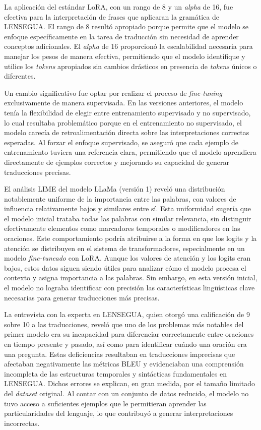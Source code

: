 La aplicación del estándar LoRA, con un rango de 8 y un \textit{alpha} de 16, fue efectiva para la interpretación de frases que aplicaran la gramática de LENSEGUA. El rango de 8 resultó apropiado porque permite que el modelo se enfoque específicamente en la tarea de traducción sin necesidad de aprender conceptos adicionales. El \textit{alpha} de 16 proporcionó la escalabilidad necesaria para manejar los pesos de manera efectiva, permitiendo que el modelo identifique y utilice los \textit{tokens} apropiados sin cambios drásticos en presencia de \textit{tokens} únicos o diferentes.

Un cambio significativo fue optar por realizar el proceso de \textit{fine-tuning} exclusivamente de manera supervisada. En las versiones anteriores, el modelo tenía la flexibilidad de elegir entre entrenamiento supervisado y no supervisado, lo cual resultaba problemático porque en el entrenamiento no supervisado, el modelo carecía de retroalimentación directa sobre las interpretaciones correctas esperadas. Al forzar el enfoque supervisado, se aseguró que cada ejemplo de entrenamiento tuviera una referencia clara, permitiendo que el modelo aprendiera directamente de ejemplos correctos y mejorando su capacidad de generar traducciones precisas.

El análisis LIME del modelo LLaMa (versión 1) reveló una distribución notablemente uniforme de la importancia entre las palabras, con valores de influencia relativamente bajos y similares entre sí. Esta uniformidad sugería que el modelo inicial trataba todas las palabras con similar relevancia, sin distinguir efectivamente elementos como marcadores temporales o modificadores en las oraciones. Este comportamiento podría atribuirse a la forma en que los logits y la atención se distribuyen en el sistema de transformadores, especialmente en un modelo \textit{fine-tuneado} con LoRA. Aunque los valores de atención y los logits eran bajos, estos datos siguen siendo útiles para analizar cómo el modelo procesa el contexto y asigna importancia a las palabras. Sin embargo, en esta versión inicial, el modelo no lograba identificar con precisión las características lingüísticas clave necesarias para generar traducciones más precisas.

La entrevista con la experta en LENSEGUA, quien otorgó una calificación de 9 sobre 10 a las traducciones, reveló que uno de los problemas más notables del primer modelo era su incapacidad para diferenciar correctamente entre oraciones en tiempo presente y pasado, así como para identificar cuándo una oración era una pregunta. Estas deficiencias resultaban en traducciones imprecisas que afectaban negativamente las métricas BLEU y evidenciaban una comprensión incompleta de las estructuras temporales y sintácticas fundamentales en LENSEGUA. Dichos errores se explican, en gran medida, por el tamaño limitado del \textit{dataset} original. Al contar con un conjunto de datos reducido, el modelo no tuvo acceso a suficientes ejemplos que le permitieran aprender las particularidades del lenguaje, lo que contribuyó a generar interpretaciones incorrectas.

